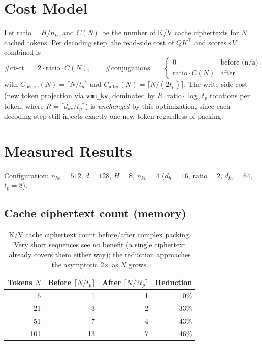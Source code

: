 \documentclass[11pt]{article}
\begin{document}
\section{Cost Model}
\label{sec:cost-model}

Let $\mathrm{ratio} = H / n_{kv}$ and $C(N)$ be the number of K/V cache
ciphertexts for $N$ cached tokens. Per decoding step, the read-side cost of
$QK^\top$ and scores$\times V$ combined is
\[
  \#\text{ct-ct} \;=\; 2 \cdot \mathrm{ratio} \cdot C(N), \qquad
  \#\text{conjugations} \;=\;
  \begin{cases}
    0 & \text{before (n/a)}\\
    \mathrm{ratio} \cdot C(N) & \text{after}
  \end{cases}
\]
with $C_{\text{before}}(N) = \lceil N / t_p \rceil$ and
$C_{\text{after}}(N) = \lceil N / (2 t_p) \rceil$. The write-side cost (new
token projection via \texttt{vmm\_kv}, dominated by
$R \cdot \mathrm{ratio} \cdot \log_2 t_p$ rotations per token, where
$R = \lceil d_{kv} / t_p \rceil$) is \emph{unchanged} by this optimization,
since each decoding step still injects exactly one new token regardless of
packing.

\section{Measured Results}
\label{sec:measured-results}

Configuration: $n_{he} = 512$, $d = 128$, $H = 8$, $n_{kv} = 4$
($d_h = 16$, $\mathrm{ratio} = 2$, $d_{kv} = 64$, $t_p = 8$).

\subsection{Cache ciphertext count (memory)}
\begin{table}[H]
\centering
\begin{tabular}{rrrr}
\toprule
Tokens $N$ & Before $\lceil N/t_p \rceil$ & After $\lceil N/2t_p \rceil$ & Reduction \\
\midrule
6   & 1  & 1 & 0\%  \\
21  & 3  & 2 & 33\% \\
51  & 7  & 4 & 43\% \\
101 & 13 & 7 & 46\% \\
\bottomrule
\end{tabular}
\caption{K/V cache ciphertext count before/after complex packing. Very
short sequences see no benefit (a single ciphertext already covers them
either way); the reduction approaches the asymptotic 2$\times$ as $N$
grows.}
\end{table}
\end{document}
